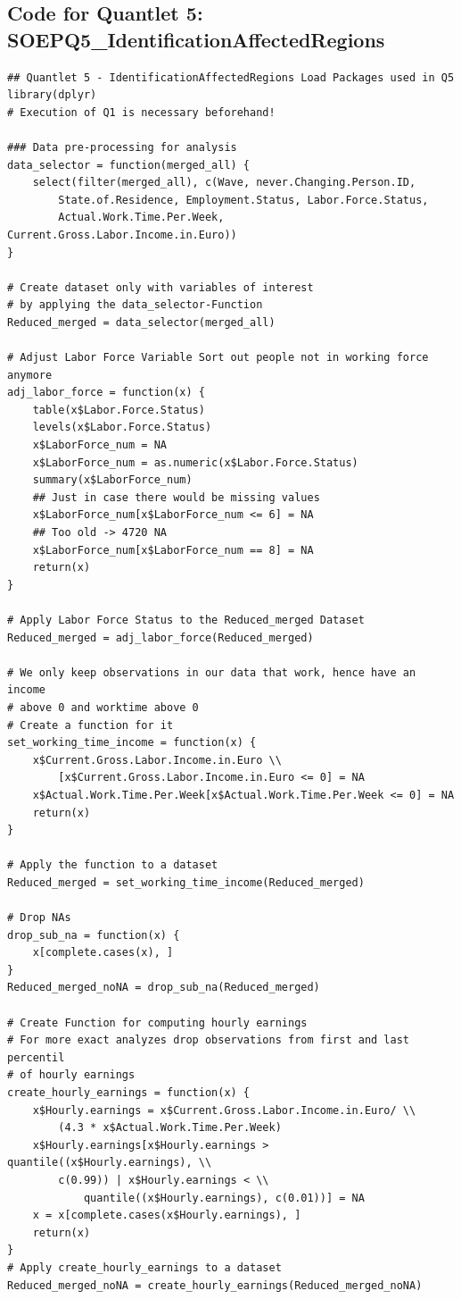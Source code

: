 \documentclass[a4paper]{article}
\begin{document}
{\subsection{Code for Quantlet 5: SOEPQ5\_IdentificationAffectedRegions}
\begin{lstlisting}
## Quantlet 5 - IdentificationAffectedRegions Load Packages used in Q5
library(dplyr)
# Execution of Q1 is necessary beforehand!

### Data pre-processing for analysis
data_selector = function(merged_all) {
    select(filter(merged_all), c(Wave, never.Changing.Person.ID, 
    	State.of.Residence, Employment.Status, Labor.Force.Status, 
        Actual.Work.Time.Per.Week, Current.Gross.Labor.Income.in.Euro))
}

# Create dataset only with variables of interest 
# by applying the data_selector-Function
Reduced_merged = data_selector(merged_all)

# Adjust Labor Force Variable Sort out people not in working force anymore
adj_labor_force = function(x) {
    table(x$Labor.Force.Status)
    levels(x$Labor.Force.Status)
    x$LaborForce_num = NA
    x$LaborForce_num = as.numeric(x$Labor.Force.Status)
    summary(x$LaborForce_num)
    ## Just in case there would be missing values
    x$LaborForce_num[x$LaborForce_num <= 6] = NA
    ## Too old -> 4720 NA
    x$LaborForce_num[x$LaborForce_num == 8] = NA
    return(x)
}

# Apply Labor Force Status to the Reduced_merged Dataset
Reduced_merged = adj_labor_force(Reduced_merged)

# We only keep observations in our data that work, hence have an income 
# above 0 and worktime above 0
# Create a function for it
set_working_time_income = function(x) {
    x$Current.Gross.Labor.Income.in.Euro \\
    	[x$Current.Gross.Labor.Income.in.Euro <= 0] = NA
    x$Actual.Work.Time.Per.Week[x$Actual.Work.Time.Per.Week <= 0] = NA
    return(x)
}

# Apply the function to a dataset
Reduced_merged = set_working_time_income(Reduced_merged)

# Drop NAs
drop_sub_na = function(x) {
    x[complete.cases(x), ]
}
Reduced_merged_noNA = drop_sub_na(Reduced_merged)

# Create Function for computing hourly earnings 
# For more exact analyzes drop observations from first and last percentil 
# of hourly earnings
create_hourly_earnings = function(x) {
    x$Hourly.earnings = x$Current.Gross.Labor.Income.in.Euro/ \\
    	(4.3 * x$Actual.Work.Time.Per.Week)
    x$Hourly.earnings[x$Hourly.earnings > quantile((x$Hourly.earnings), \\ 
    	c(0.99)) | x$Hourly.earnings < \\
        	quantile((x$Hourly.earnings), c(0.01))] = NA
    x = x[complete.cases(x$Hourly.earnings), ]
    return(x)
}
# Apply create_hourly_earnings to a dataset
Reduced_merged_noNA = create_hourly_earnings(Reduced_merged_noNA)


\end{lstlisting}}
\end{document}
